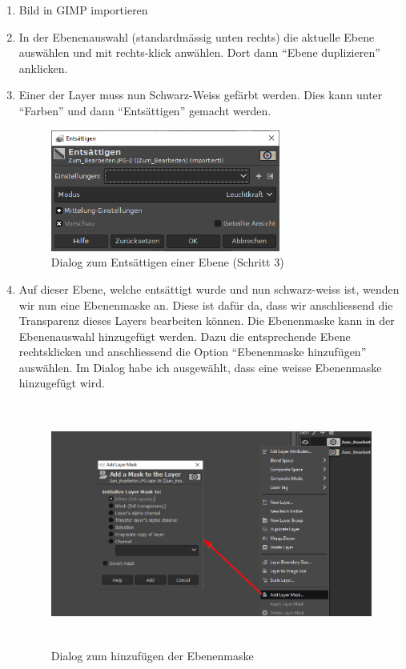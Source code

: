 \documentclass[11pt]{article}
\begin{document}
    \begin{enumerate}
        \item Bild in GIMP importieren
        \item In der Ebenenauswahl (standardmässig unten rechts) die aktuelle Ebene auswählen und mit rechts-klick
        anwählen. Dort dann ``Ebene duplizieren'' anklicken.
        \item Einer der Layer muss nun Schwarz-Weiss gefärbt werden. Dies kann unter ``Farben'' und dann
        ``Entsättigen'' gemacht werden.

        \begin{figure}[h]
            \centering
            \includegraphics[height=4cm]{media/menu_desaturate}
            \caption{Dialog zum Entsättigen einer Ebene (Schritt 3)}
        \end{figure}

        \item Auf dieser Ebene, welche entsättigt wurde und nun schwarz-weiss ist, wenden wir nun eine
        Ebenenmaske an. Diese ist dafür da, dass wir anschliessend die Transparenz dieses Layers bearbeiten können.
        Die Ebenenmaske kann in der Ebenenauswahl hinzugefügt werden. Dazu die entsprechende Ebene rechtsklicken und
        anschliessend die Option ``Ebenenmaske hinzufügen'' auswählen. Im Dialog habe ich ausgewählt, dass eine weisse
        Ebenenmaske hinzugefügt wird.

        \begin{figure}[h]
            \centering
            \includegraphics[height=8cm]{media/layer_mask}
            \caption{Dialog zum hinzufügen der Ebenenmaske}
        \end{figure}


\end{enumerate}
\end{document}
